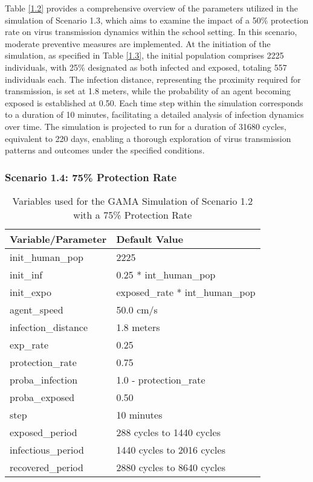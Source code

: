 Table \ref{1.2} provides a comprehensive overview of the parameters utilized in the simulation of Scenario 1.3, which aims to examine the impact of a 50\% protection rate on virus transmission dynamics within the school setting. In this scenario, moderate preventive measures are implemented. At the initiation of the simulation, as specified in Table \ref{1.3}, the initial population comprises 2225 individuals, with 25\% designated as both infected and exposed, totaling 557 individuals each. The infection distance, representing the proximity required for transmission, is set at 1.8 meters, while the probability of an agent becoming exposed is established at 0.50. Each time step within the simulation corresponds to a duration of 10 minutes, facilitating a detailed analysis of infection dynamics over time. The simulation is projected to run for a duration of 31680 cycles, equivalent to 220 days, enabling a thorough exploration of virus transmission patterns and outcomes under the specified conditions.

\subsubsection{Scenario 1.4: 75\% Protection Rate}
\begin{table}[H]
	\centering
	{\begin{tabular}{ll}
			\toprule
			\textbf{Variable/Parameter} & \textbf{Default Value}\\
			\hline
			init\_human\_pop & 2225\\
			init\_inf & 0.25 * int\_human\_pop\\
			init\_expo & exposed\_rate * int\_human\_pop \\
			agent\_speed & 50.0 cm/s\\
			infection\_distance & 1.8 meters\\
			exp\_rate & 0.25\\
			protection\_rate & 0.75\\
			proba\_infection & 1.0 - protection\_rate\\
			proba\_exposed & 0.50\\
			step & 10 minutes\\
			exposed\_period & 288 cycles to 1440 cycles\\
			infectious\_period & 1440 cycles to 2016 cycles\\
			recovered\_period & 2880 cycles to 8640 cycles\\ 
			\bottomrule
		\end{tabular}
		\caption{Variables used for the GAMA Simulation of Scenario 1.2 with a 75\% Protection Rate}
		\label{1.4}}
\end{table}

